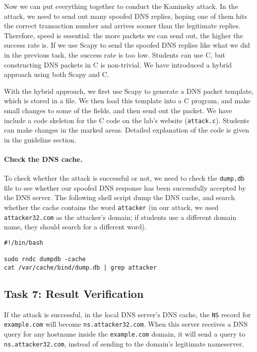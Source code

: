 Now we can put everything together to conduct the Kaminsky attack. 
In the attack, we need to send out many spoofed DNS replies, hoping 
one of them hits the correct transaction number and arrives sooner
than the legitimate replies. Therefore, speed is essential: the more packets 
we can send out, the higher the success rate is. If we use 
Scapy to send the spoofed DNS replies like what we did in the 
previous task, the success rate is too low. Students can use 
C, but constructing DNS packets in C is non-trivial. 
We have introduced a hybrid approach using both Scapy and C. 


With the hybrid approach, we first use Scapy to generate 
a DNS packet template, which is stored in a file. 
We then load this template into a C program, and make 
small changes to some of the fields, and then send 
out the packet. 
We have include a code skeleton for the C code
on the lab's website (\texttt{attack.c}). 
Students can make changes
in the marked areas. Detailed explanation
of the code is given in the 
guideline section.


\paragraph{Check the DNS cache.}
To check whether the attack is successful or not, we need to 
check the {\tt dump.db} file to see whether our spoofed DNS
response has been successfully accepted by the DNS server. 
The following shell script dump the DNS cache, and search whether
the cache contains the word \texttt{attacker} (in our 
attack, we used \texttt{attacker32.com} as the attacker's 
domain; if students use a different domain name, they should 
search for a different word).  

\begin{lstlisting}
#!/bin/bash

sudo rndc dumpdb -cache
cat /var/cache/bind/dump.db | grep attacker
\end{lstlisting}
 

\subsection{Task 7: Result Verification}

If the attack is successful, in the local DNS server's DNS cache, 
the {\tt NS} record for \texttt{example.com} will become 
\texttt{ns.attacker32.com}.
When this server receives a DNS query for any hostname
inside the \texttt{example.com} domain,  it will
send a query to \texttt{ns.attacker32.com}, instead of 
sending to the domain's legitimate nameserver. 


